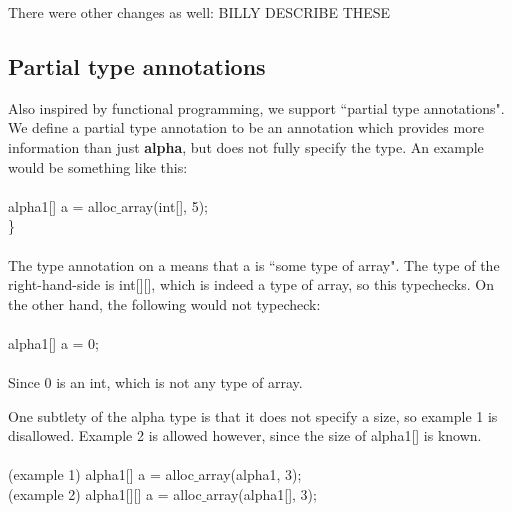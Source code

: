 \documentclass{article}
\begin{document}
There were other changes as well: BILLY DESCRIBE THESE

\subsection{Partial type annotations}
Also inspired by functional programming, we support ``partial type annotations". We define a partial type annotation to be an annotation which provides more information than just \textbf{alpha}, but does not fully specify the type. An example would be something like this:\\
\\
alpha1[] a = alloc$\_$array(int[], 5);\\
\}\\
\\
The type annotation on a means that a is ``some type of array". The type of the right-hand-side is int[][], which is indeed a type of array, so this typechecks. On the other hand, the following would not typecheck:\\
\\
alpha1[] a = 0;\\
\\
Since 0 is an int, which is not any type of array.

One subtlety of the alpha type is that it does not specify a size, so example 1 is disallowed. Example 2 is allowed however, since the size of alpha1[] is known.\\
\\
(example 1) alpha1[] a = alloc$\_$array(alpha1, 3);\\
(example 2) alpha1[][] a = alloc$\_$array(alpha1[], 3);\\
\\
\end{document}

